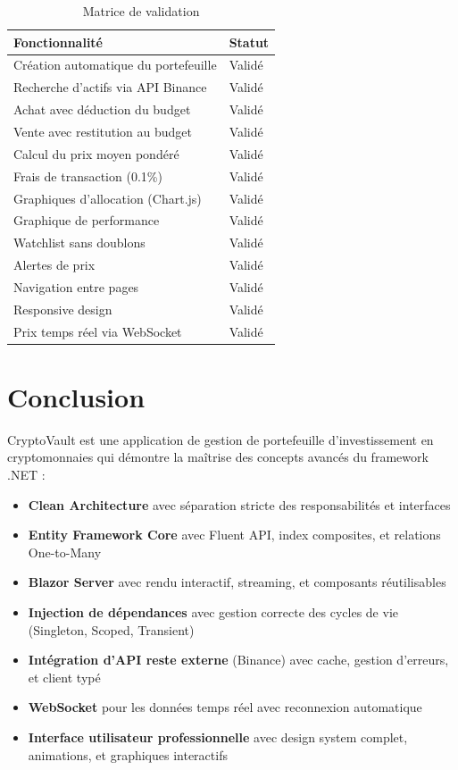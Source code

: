 \documentclass[12pt,a4paper]{article}
\begin{document}
\begin{table}[H]
\centering
\caption{Matrice de validation}
\begin{tabularx}{\textwidth}{Xl}
    \toprule
    \textbf{Fonctionnalité} & \textbf{Statut} \\
    \midrule
    Création automatique du portefeuille & Validé \\
    Recherche d'actifs via API Binance & Validé \\
    Achat avec déduction du budget & Validé \\
    Vente avec restitution au budget & Validé \\
    Calcul du prix moyen pondéré & Validé \\
    Frais de transaction (0.1\%) & Validé \\
    Graphiques d'allocation (Chart.js) & Validé \\
    Graphique de performance & Validé \\
    Watchlist sans doublons & Validé \\
    Alertes de prix & Validé \\
    Navigation entre pages & Validé \\
    Responsive design & Validé \\
    Prix temps réel via WebSocket & Validé \\
    \bottomrule
\end{tabularx}
\end{table}

\section{Conclusion}

CryptoVault est une application de gestion de portefeuille d'investissement en cryptomonnaies qui démontre la maîtrise des concepts avancés du framework .NET :

\begin{itemize}
    \item \textbf{Clean Architecture} avec séparation stricte des responsabilités et interfaces
    \item \textbf{Entity Framework Core} avec Fluent API, index composites, et relations One-to-Many
    \item \textbf{Blazor Server} avec rendu interactif, streaming, et composants réutilisables
    \item \textbf{Injection de dépendances} avec gestion correcte des cycles de vie (Singleton, Scoped, Transient)
    \item \textbf{Intégration d'API reste externe} (Binance) avec cache, gestion d'erreurs, et client typé
    \item \textbf{WebSocket} pour les données temps réel avec reconnexion automatique
    \item \textbf{Interface utilisateur professionnelle} avec design system complet, animations, et graphiques interactifs
\end{itemize}
\end{document}
